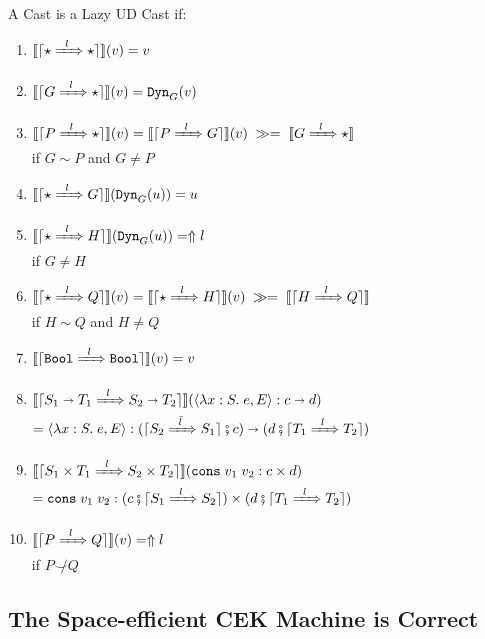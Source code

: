 \documentclass[runningheads]{llncs}
\newcommand{\error}[1]{\ensuremath{\Uparrow#1}}
\newcommand{\Tdyn}[0]{\ensuremath{\star}}
\newcommand{\Pbool}[0]{\ensuremath{\mathtt{Bool}}}
\newcommand{\Pfunc}[2]{\ensuremath{#1 \shortrightarrow #2}}
\newcommand{\Pprod}[2]{\ensuremath{#1 \times #2}}
\newcommand{\elam}[3]{\lambda#1:#2.\;#3}
\newcommand{\econs}[2]{\mathtt{cons} \; #1 \; #2}
\newcommand{\ecast}[2]{\ensuremath{#1 : #2}}
\newcommand{\ccast}[3]{#1 \xRightarrow[]{\enskip #2 \enskip} #3}
\newcommand{\vdyn}[2]{\mathtt{Dyn}_{#1}(#2)}
\newcommand{\vfunc}[4]{\langle\elam{#1}{#2}{#3},#4\rangle}
\newcommand{\vcons}[2]{\econs{#1}{#2}}
\newcommand{\mbind}[0]{\ensuremath{\;\gg=\;}}
\newcommand{\denote}[1]{\ensuremath{\llbracket #1 \rrbracket}}
\newcommand{\compose}[2]{\ensuremath{#1 \fatsemi #2}}
\newcommand{\translate}[1]{\ensuremath{\lceil#1\rceil}}
\newcommand{\notshallowlyconsistent}[2]{\ensuremath{#1\not\smile#2}}
\begin{document}
\begin{definition}
	\label{def:LazyUD-CastADT}
	A Cast is a Lazy UD Cast if:
	\begin{enumerate}
	\item $\denote{\translate{\ccast{\Tdyn}{l}{\Tdyn}}}(v) = v$
	\item $\denote{\translate{\ccast{G}{l}{\Tdyn}}}(v) = \vdyn{G}{v}$
	\item $\denote{\translate{\ccast{P}{l}{\Tdyn}}}(v) = 
		\denote{\translate{\ccast{P}{l}{G}}}(v) \mbind 
		\denote{\ccast{G}{l}{\Tdyn}}$\\
		if $G \sim P$ and $G \neq P$	
	\item $\denote{\translate{\ccast{\Tdyn}{l}{G}}}(\vdyn{G}{u}) = u$
	\item $\denote{\translate{\ccast{\Tdyn}{l}{H}}}(\vdyn{G}{u}) = \error{l}$\\
		if $G \neq H$
	\item $\denote{\translate{\ccast{\Tdyn}{l}{Q}}}(v) = 
		\denote{\translate{\ccast{\Tdyn}{l}{H}}}(v) \mbind
		\denote{\translate{\ccast{H}{l}{Q}}}$\\
		if $H \sim Q$ and $H \neq Q$
	\item $\denote{\translate{\ccast{\Pbool}{l}{\Pbool}}}(v) = v$
		\item 
		$\denote{\translate{\ccast{\Pfunc{S_1}{T_1}}{l}{\Pfunc{S_2}{T_2}}}}(
		\ecast{\vfunc{x}{S}{e}{E}}{\Pfunc{c}{d}})$\\
		$=
		\ecast{\vfunc{x}{S}{e}{E}}{
			\Pfunc{
				(\compose{\translate{\ccast{S_2}{\bar{l}}{S_1}}}{c})}{
				(\compose{d}{\translate{\ccast{T_1}{l}{T_2}}})}}$
		\item 
		$\denote{\translate{\ccast{\Pprod{S_1}{T_1}}{l}{\Pprod{S_2}{T_2}}}}(
		\ecast{\vcons{v_1}{v_2}}{\Pprod{c}{d}})$\\
		$=
		\ecast{\vcons{v_1}{v_2}}{
			\Pprod{
				(\compose{c}{\translate{\ccast{S_1}{l}{S_2}}})}{
				(\compose{d}{\translate{\ccast{T_1}{l}{T_2}}})}}$
		\item $\denote{\translate{\ccast{P}{l}{Q}}}(v) = \error{l}$\\
			if $\notshallowlyconsistent{P}{Q}$
	\end{enumerate}
\end{definition}

\subsection{The Space-efficient CEK Machine is Correct}
\label{sec:S-correct}
\end{document}
